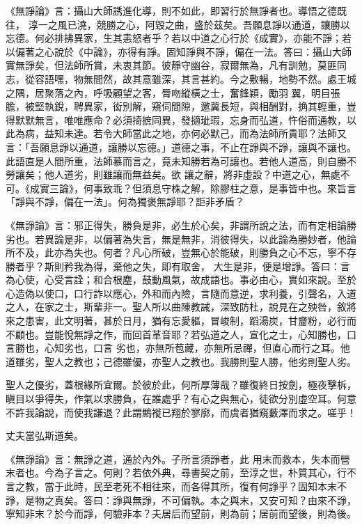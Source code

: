 \begin{pinyinscope}
 《無諍論》言：攝山大師誘進化導，則不如此，即習行於無諍者也。導悟之德既往，
 淳一之風已澆，競勝之心，阿毀之曲，盛於茲矣。吾願息諍以通道，讓勝以忘德。何必排拂異家，生其恚怒者乎？若以中道之心行於《成實》，亦能不諍；若以偏著之心說於《中論》，亦得有諍。固知諍與不諍，偏在一法。答曰：攝山大師實無諍矣，但法師所賞，未衷其節。彼靜守幽谷，寂爾無為，凡有訓勉，莫匪同志，從容語嘿，物無間然，故其意雖深，其言甚約。今之敷暢，地勢不然。處王城之隅，居聚落之內，呼吸顧望之客，脣吻縱橫之士，奮鋒穎，勵羽
 翼，明目張膽，被堅執銳，聘異家，衒別解，窺伺間隙，邀冀長短，與相酬對，捔其輕重，豈得默默無言，唯唯應命？必須掎摭同異，發擿玼瑕，忘身而弘道，忤俗而通教，以此為病，益知未達。若令大師當此之地，亦何必默己，而為法師所貴耶？法師又言：「吾願息諍以通道，讓勝以忘德。」道德之事，不止在諍與不諍，讓與不讓也。此語直是人間所重，法師慕而言之，竟未知勝若為可讓也。若他人道高，則自勝不勞讓矣；他人道劣，則雖讓而無益矣。欲
 讓之辭，將非虛設？中道之心，無處不可。《成實三論》，何事致乖？但須息守株之解，除膠柱之意，是事皆中也。來旨言「諍與不諍，偏在一法」。何為獨褒無諍耶？詎非矛盾？



 《無諍論》言：邪正得失，勝負是非，必生於心矣，非謂所說之法，而有定相論勝劣也。若異論是非，以偏著為失言，無是無非，消彼得失，以此論為勝妙者，他論所不及，此亦為失也。何者？凡心所破，豈無心於能破，則勝負之心不忘，寧不存勝者乎？斯則矜我為得，棄他之失，即有取舍，
 大生是非，便是增諍。答曰：言為心使，心受言詮；和合根塵，鼓動風氣，故成語也。事必由心，實如來說。至於心造偽以使口，口行詐以應心，外和而內險，言隨而意逆，求利養，引聲名，入道之人，在家之士，斯輩非一。聖人所以曲陳教誡，深致防杜，說見在之殃咎，敘將來之患害，此文明著，甚於日月，猶有忘愛軀，冒峻制，蹈湯炭，甘齏粉，必行而不顧也。豈能悅無諍之作，而回首革音耶？若弘道之人，宣化之士，心知勝也，口言勝也，心知劣也，口言
 劣也，亦無所苞藏，亦無所忌禪，但直心而行之耳。他道雖劣，聖人之教也；己德雖優，亦聖人之教也。我勝則聖人勝，他劣則聖人劣。



 聖人之優劣，蓋根緣所宜爾。於彼於此，何所厚薄哉？雖復終日按劍，極夜擊柝，瞋目以爭得失，作氣以求勝負，在誰處乎？有心之與無心，徒欲分別虛空耳。何意不許我論說，而使我謙退？此謂鷦褷已翔於寥廓，而虞者猶窺藪澤而求之。嗟乎！



 丈夫當弘斯道矣。



 《無諍論》言：無諍之道，通於內外。子所言須諍者，此
 用末而救本，失本而營末者也。今為子言之。何則？若依外典，尋書契之前，至淳之世，朴質其心，行不言之教，當于此時，民至老死不相往來，而各得其所，復有何諍乎？固知本末不諍，是物之真矣。答曰：諍與無諍，不可偏執。本之與末，又安可知？由來不諍，寧知非末？於今而諍，何驗非本？夫居后而望前，則為前；居前而望後，則為後。




\end{pinyinscope}
